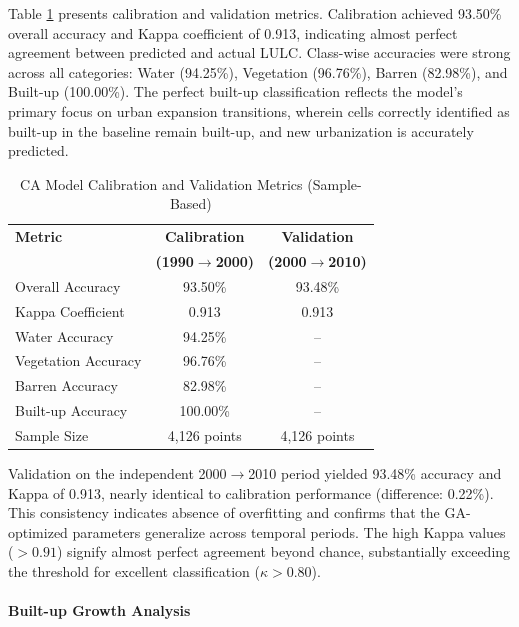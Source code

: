 \documentclass[12pt,a4paper]{article}
\begin{document}
Table \ref{tab:ca_calibration} presents calibration and validation metrics. Calibration achieved 93.50\% overall accuracy and Kappa coefficient of 0.913, indicating almost perfect agreement between predicted and actual LULC. Class-wise accuracies were strong across all categories: Water (94.25\%), Vegetation (96.76\%), Barren (82.98\%), and Built-up (100.00\%). The perfect built-up classification reflects the model's primary focus on urban expansion transitions, wherein cells correctly identified as built-up in the baseline remain built-up, and new urbanization is accurately predicted.

\begin{table}[H]
\caption{CA Model Calibration and Validation Metrics (Sample-Based)}
\label{tab:ca_calibration}
\centering
\small
\renewcommand{\arraystretch}{1.2}
\begin{tabular}{lcc}
\toprule
\textbf{Metric} & \textbf{Calibration} & \textbf{Validation} \\
 & \textbf{(1990$\rightarrow$2000)} & \textbf{(2000$\rightarrow$2010)} \\
\midrule
Overall Accuracy & 93.50\% & 93.48\% \\
Kappa Coefficient & 0.913 & 0.913 \\
Water Accuracy & 94.25\% & -- \\
Vegetation Accuracy & 96.76\% & -- \\
Barren Accuracy & 82.98\% & -- \\
Built-up Accuracy & 100.00\% & -- \\
\midrule
Sample Size & 4,126 points & 4,126 points \\
\bottomrule
\end{tabular}
\end{table}

Validation on the independent 2000$\rightarrow$2010 period yielded 93.48\% accuracy and Kappa of 0.913, nearly identical to calibration performance (difference: 0.22\%). This consistency indicates absence of overfitting and confirms that the GA-optimized parameters generalize across temporal periods. The high Kappa values ($>0.91$) signify almost perfect agreement beyond chance, substantially exceeding the threshold for excellent classification ($\kappa > 0.80$).

\paragraph{Built-up Growth Analysis}
\end{document}
